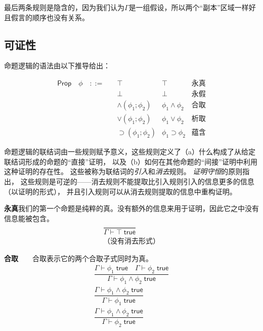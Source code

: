最后两条规则是隐含的，因为我们认为${\Gamma}$是一组假设，所以两个“副本”区域一样好且假言的顺序也没有关系。

\subsection{可证性}
命题逻辑的语法由以下推导给出：

$$
\begin{array}{llll}
\mathsf{Prop}\quad\phi\quad ::= \quad &\top              &\top                   &\text{永真}\\
                                    &\bot                  &\bot                   &\text{永假}\\\
                                    &\land(\phi_1;\phi_2)  &\phi_1 \land \phi_2\;  &\text{合取}\\
                                    &\lor(\phi_1;\phi_2)   &\phi_1 \lor \phi_2\;   &\text{析取}\\
                                    &\supset(\phi_1;\phi_2) &\phi_1 \supset \phi_2 & \text{蕴含}
\end{array}
$$


命题逻辑的联结词由一些规则赋予意义，这些规则定义了（a）什么构成了从给定联结词形成的命题的``直接''证明，
以及（b）如何在其他命题的``间接''证明中利用这种证明的存在性。 这些被称为联结词的\textit{引入}和\textit{消去}规则。
\textit{证明守恒}的原则指出， 这些规则是可逆的——消去规则不能提取比引入规则引入的信息更多的信息（以证明的形式），
并且引入规则可以从消去规则提取的信息中重构证明。

\textbf{永真}\qquad 我们的第一个命题是纯粹的真。没有额外的信息来用于证明，因此它之中没有信息能被包含。
\begin{subequations}
    \begin{gather}
    \dfrac{}{\Gamma \vdash \top \;\mathsf{true}}\\
    \text{（没有消去形式）}
    \end{gather}
\end{subequations}


\textbf{合取}${\qquad}$合取表示它的两个合取子式同时为真。
\begin{subequations}
    \begin{gather}
        \dfrac{\Gamma \vdash \phi_1\; \mathsf{true}\quad\Gamma \vdash \phi_2\; \mathsf{true}}{\Gamma \vdash \phi_1 \land \phi_2\; \mathsf{true}}\\
        \dfrac{\Gamma \vdash \phi_1 \land \phi_2\; \mathsf{true}}{\Gamma \vdash \phi_1\; \mathsf{true}}\\
        \dfrac{\Gamma \vdash \phi_1 \land \phi_2\; \mathsf{true}}{\Gamma \vdash \phi_2\; \mathsf{true}}
    \end{gather}
\end{subequations}

